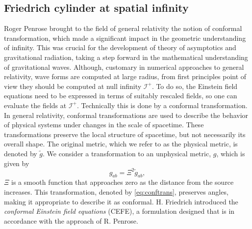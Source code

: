 \documentclass[
11pt, %
english, %
singlespacing, %
headsepline, %
]{MastersDoctoralThesis} %
\begin{document}
\subsection{Friedrich cylinder at spatial infinity}
Roger Penrose brought to the field of general relativity the notion of
conformal transformation, which made a significant impact in the
geometric understanding of infinity. This was crucial for the
development of theory of asymptotics and gravitational radiation,
taking a step forward in the mathematical understanding of
gravitational waves.  Although, customary in numerical approaches to
general relativity, wave forms are computed at large radius, from
first principles point of view they should be computed at null
infinity  $\mathscr{I}^+$. To do
so, the Einstein field equations need to be expressed in terms of
suitably rescaled fields, so one can evaluate the fields at
$\mathscr{I}^+$. Technically this is done by a conformal
transformation. In general relativity, conformal transformations are
used to describe the behavior of physical systems under changes in the
scale of spacetime. These transformations preserve the local structure
of spacetime, but not necessarily its overall shape.
The original
metric, which we refer to as the physical metric, is denoted by
$\tilde{g}$. We consider a transformation to an unphysical metric,
$g$, which is given by
\begin{equation}\label{eq:conftrans}
	g_{ab} = \Xi^2 \tilde{g}_{ab},
\end{equation}
$\Xi$ is a smooth function that approaches zero as the distance from
the source increases. This transformation, denoted by \eqref{eq:conftrans}, preserves
angles, making it appropriate to describe it as conformal.
H. Friedrich introduced the \textit{conformal Einstein field
  equations} (CEFE), a formulation designed that is in accordance with
the approach of R. Penrose.

\medskip
\end{document}
